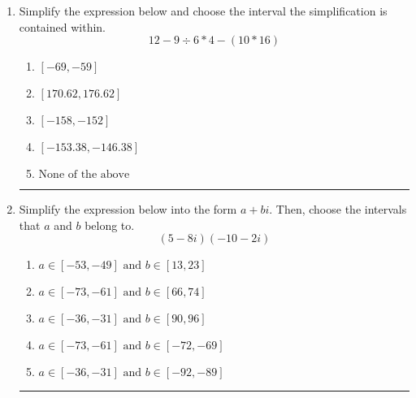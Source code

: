 \documentclass[14pt]{extbook}
\newcommand{\litem}[1]{\item#1\hspace*{-1cm}\rule{\textwidth}{0.4pt}}
\begin{document}
\begin{enumerate}
{\begin{enumerate}[label=\Alph*.]
\end{enumerate} }
\litem{
Simplify the expression below and choose the interval the simplification is contained within.\[ 12 - 9 \div 6 * 4 - (10 * 16) \]\begin{enumerate}[label=\Alph*.]
\item \( [-69, -59] \)
\item \( [170.62, 176.62] \)
\item \( [-158, -152] \)
\item \( [-153.38, -146.38] \)
\item \( \text{None of the above} \)

\end{enumerate} }
\litem{
Simplify the expression below into the form $a+bi$. Then, choose the intervals that $a$ and $b$ belong to.\[ (5 - 8 i)(-10 - 2 i) \]\begin{enumerate}[label=\Alph*.]
\item \( a \in [-53, -49] \text{ and } b \in [13, 23] \)
\item \( a \in [-73, -61] \text{ and } b \in [66, 74] \)
\item \( a \in [-36, -31] \text{ and } b \in [90, 96] \)
\item \( a \in [-73, -61] \text{ and } b \in [-72, -69] \)
\item \( a \in [-36, -31] \text{ and } b \in [-92, -89] \)

\end{enumerate} }
\end{enumerate}
\end{document}
